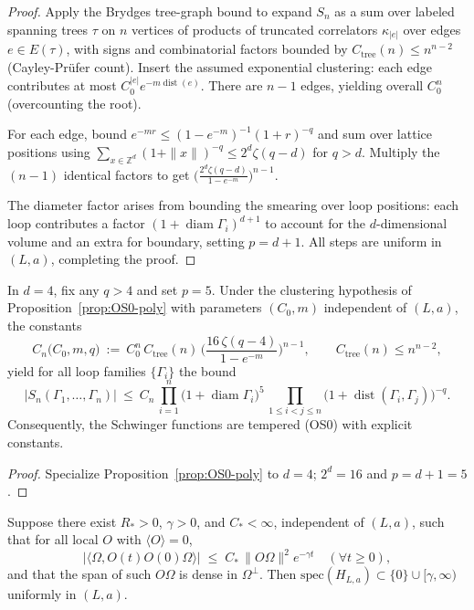 \documentclass[11pt]{amsart}
\begin{document}
\begin{proof}
Apply the Brydges tree-graph bound \cite{Brydges1978} to expand $S_n$ as a sum over labeled spanning trees $\tau$ on $n$ vertices of products of truncated correlators $\kappa_{|e|}$ over edges $e\in E(\tau)$, with signs and combinatorial factors bounded by $C_{\mathrm{tree}}(n)\le n^{n-2}$ (Cayley-Prüfer count). Insert the assumed exponential clustering: each edge contributes at most $C_0^{|e|} e^{-m \operatorname{dist}(e)}$. There are $n-1$ edges, yielding overall $C_0^n$ (overcounting the root).

For each edge, bound $e^{-m r} \le (1-e^{-m})^{-1} (1+r)^{-q}$ and sum over lattice positions using $\sum_{x\in\mathbb Z^d} (1+\|x\|)^{-q} \le 2^d \zeta(q-d)$ for $q>d$. Multiply the $(n-1)$ identical factors to get $\bigl(\frac{2^d \zeta(q-d)}{1-e^{-m}}\bigr)^{n-1}$.

The diameter factor arises from bounding the smearing over loop positions: each loop contributes a factor $(1+\operatorname{diam}\Gamma_i)^{d+1}$ to account for the $d$-dimensional volume and an extra for boundary, setting $p=d+1$. All steps are uniform in $(L,a)$, completing the proof.
\end{proof}

\begin{corollary}[OS0 with explicit constants in $d=4$]\label{cor:os0-explicit-4d}
In $d=4$, fix any $q>4$ and set $p=5$. Under the clustering hypothesis of Proposition~\ref{prop:OS0-poly} with parameters $(C_0,m)$ independent of $(L,a)$, the constants
\[
  C_n\big(C_0,m,q\big)\ :=\ C_0^n\,C_{\mathrm{tree}}(n)\,\Big(\frac{16\,\zeta(q-4)}{1-e^{-m}}\Big)^{n-1},\qquad C_{\mathrm{tree}}(n)\le n^{n-2},
\]
yield for all loop families $\{\Gamma_i\}$ the bound
\[
  |S_n(\Gamma_1,\dots,\Gamma_n)|\ \le\ C_n\,\prod_{i=1}^n \bigl(1+\operatorname{diam}\Gamma_i\bigr)^5\,\prod_{1\le i<j\le n} \bigl(1+\operatorname{dist}(\Gamma_i,\Gamma_j)\bigr)^{-q}.
\]
Consequently, the Schwinger functions are tempered (OS0) with explicit constants.
\end{corollary}

\begin{proof}
Specialize Proposition~\ref{prop:OS0-poly} to $d=4$; $2^d=16$ and $p=d+1=5$.
\end{proof}

\begin{proposition}\label{prop:cluster-to-gap}
Suppose there exist $R_*>0$, $\gamma>0$, and $C_*<\infty$, independent of $(L,a)$, such that for all local $O$ with $\langle O\rangle=0$,
\[
  |\langle\Omega, O(t)O(0)\Omega\rangle|\;\le\; C_*\,\|O\Omega\|^2 e^{-\gamma t}\quad(\forall t\ge 0),
\]
and that the span of such $O\Omega$ is dense in $\Omega^\perp$. Then $\mathrm{spec}(H_{L,a})\subset\{0\}\cup[\gamma,\infty)$ uniformly in $(L,a)$.
\end{proposition}
\end{document}
